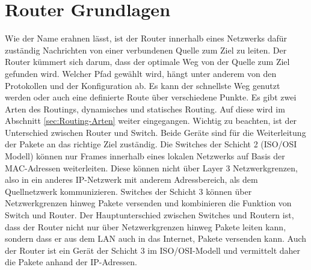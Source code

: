 	\section{Router Grundlagen}
	Wie der Name erahnen lässt, ist der Router innerhalb eines Netzwerks dafür
	zuständig Nachrichten von einer verbundenen Quelle zum Ziel zu leiten.
	Der Router kümmert sich darum, dass der optimale Weg von der Quelle zum Ziel 
	gefunden wird. Welcher Pfad gewählt wird, hängt unter anderem von den Protokollen
	und der Konfiguration ab. Es kann der schnellste Weg genutzt werden oder
	auch eine definierte Route über verschiedene Punkte. Es gibt zwei Arten
	des Routings, dynamisches und statisches Routing. Auf diese wird im Abschnitt
	\ref{sec:Routing-Arten} weiter eingegangen.
	Wichtig zu beachten, ist der Unterschied zwischen Router und Switch. Beide
	Geräte sind für die Weiterleitung der Pakete an das richtige Ziel zuständig.
	Die Switches der Schicht 2 (ISO/OSI Modell) können nur Frames innerhalb 
	eines lokalen Netzwerks auf Basis der MAC-Adressen weiterleiten. 
	Diese können nicht über Layer 3 Netzwerkgrenzen, also in ein anderes 
	IP-Netzwerk mit anderem Adressbereich, als dem Quellnetzwerk kommunizieren. 
	Switches der Schicht 3 können über Netzwerkgrenzen hinweg Pakete versenden 
	und kombinieren die Funktion von Switch und Router. Der Hauptunterschied 
	zwischen Switches und Routern ist, dass der Router nicht nur über Netzwerkgrenzen 
	hinweg Pakete leiten kann, sondern dass er aus dem LAN auch in das Internet, 
	Pakete versenden kann. Auch der Router ist ein Gerät der Schicht
	3 im ISO/OSI-Modell und vermittelt daher die Pakete anhand der IP-Adressen.
	\cite{zisler2022, baun2025}
	
